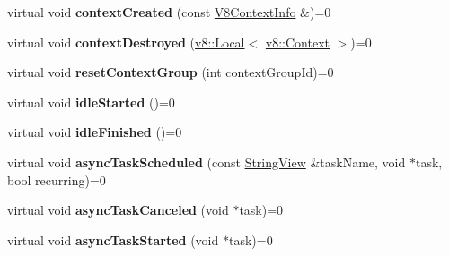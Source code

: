 \begin{DoxyCompactItemize}
\item 
\mbox{\label{classv8__inspector_1_1V8Inspector_a2027babae023eb7745a699de30ef2040}} 
virtual void {\bfseries context\+Created} (const \mbox{\hyperlink{classv8__inspector_1_1V8ContextInfo}{V8\+Context\+Info}} \&)=0
\item 
\mbox{\label{classv8__inspector_1_1V8Inspector_a519c21ce7d4693e27c0b2859f3c5901d}} 
virtual void {\bfseries context\+Destroyed} (\mbox{\hyperlink{classv8_1_1Local}{v8\+::\+Local}}$<$ \mbox{\hyperlink{classv8_1_1Context}{v8\+::\+Context}} $>$)=0
\item 
\mbox{\label{classv8__inspector_1_1V8Inspector_ab65e4ca3316c60644bfdefc52a769d99}} 
virtual void {\bfseries reset\+Context\+Group} (int context\+Group\+Id)=0
\item 
\mbox{\label{classv8__inspector_1_1V8Inspector_a923d7681b39db723a43b279a7429d9ea}} 
virtual void {\bfseries idle\+Started} ()=0
\item 
\mbox{\label{classv8__inspector_1_1V8Inspector_a679251f1e8f90799c45dde8a86c73a80}} 
virtual void {\bfseries idle\+Finished} ()=0
\item 
\mbox{\label{classv8__inspector_1_1V8Inspector_ab9d050ddc357b771b932af978e52aff3}} 
virtual void {\bfseries async\+Task\+Scheduled} (const \mbox{\hyperlink{classv8__inspector_1_1StringView}{String\+View}} \&task\+Name, void $\ast$task, bool recurring)=0
\item 
\mbox{\label{classv8__inspector_1_1V8Inspector_ad443be8234a20744558250b92451fc9d}} 
virtual void {\bfseries async\+Task\+Canceled} (void $\ast$task)=0
\item 
\mbox{\label{classv8__inspector_1_1V8Inspector_a18081a671c17b6c8cc9e827e834518fc}} 
virtual void {\bfseries async\+Task\+Started} (void $\ast$task)=0
\item 
\mbox{\label{classv8__inspector_1_1V8Inspector_aa19d6664fb011102014395d54d16ed68}} 

\end{DoxyCompactItemize}
